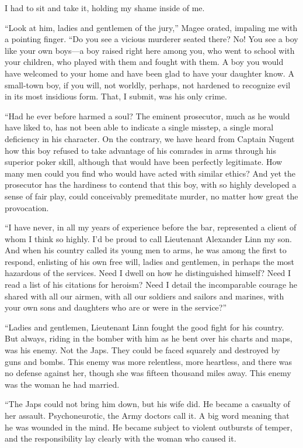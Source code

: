 \documentclass{novel}
\begin{document}
I had to sit and take it, holding my shame inside of me.

“Look at him, ladies and gentlemen of the jury,” Magee orated, impaling me with a pointing finger. “Do you see a vicious murderer seated there? No! You see a boy like your own boys—a boy raised right here among you, who went to school with your children, who played with them and fought with them. A boy you would have welcomed to your home and have been glad to have your daughter know. A small-town boy, if you will, not worldly, perhaps, not hardened to recognize evil in its most insidious form. That, I submit, was his only crime.

“Had he ever before harmed a soul? The eminent prosecutor, much as he would have liked to, has not been able to indicate a single misstep, a single moral deficiency in his character. On the contrary, we have heard from Captain Nugent how this boy refused to take advantage of his comrades in arms through his superior poker skill, although that would have been perfectly legitimate. How many men could you find who would have acted with similar ethics? And yet the prosecutor has the hardiness to contend that this boy, with so highly developed a sense of fair play, could conceivably premeditate murder, no matter how great the provocation.

“I have never, in all my years of experience before the bar, represented a client of whom I think so highly. I’d be proud to call Lieutenant Alexander Linn my son. And when his country called its young men to arms, he was among the first to respond, enlisting of his own free will, ladies and gentlemen, in perhaps the most hazardous of the services. Need I dwell on how he distinguished himself? Need I read a list of his citations for heroism? Need I detail the incomparable courage he shared with all our airmen, with all our soldiers and sailors and marines, with your own sons and daughters who are or were in the service?”

“Ladies and gentlemen, Lieutenant Linn fought the good fight for his country. But always, riding in the bomber with him as he bent over his charts and maps, was his enemy. Not the Japs. They could be faced squarely and destroyed by guns and bombs. This enemy was more relentless, more heartless, and there was no defense against her, though she was fifteen thousand miles away. This enemy was the woman he had married.

“The Japs could not bring him down, but his wife did. He became a casualty of her assault. Psychoneurotic, the Army doctors call it. A big word meaning that he was wounded in the mind. He became subject to violent outbursts of temper, and the responsibility lay clearly with the woman who caused it.
\end{document}
